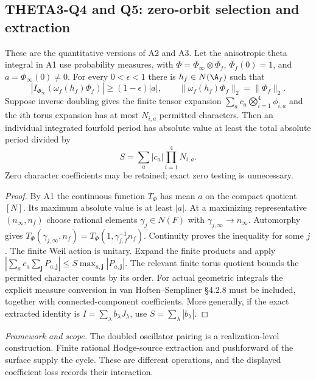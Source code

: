 \documentclass[11pt]{article}
\newcommand{\framework}[1]{\par\smallskip\noindent\textit{Framework and scope.} #1\par}
\theoremstyle{definition}\newtheorem{definition}[theorem]{Definition}\newtheorem{remark}[theorem]{Remark}
\begin{document}
\subsection{THETA3-Q4 and Q5: zero-orbit selection and extraction}\label{Q4}\label{Q5}
These are the quantitative versions of A2 and A3. Let the anisotropic theta integral in A1 use probability measures, with
$\Phi=\Phi_\infty\otimes\Phi_f$, $\Phi_f(0)=1$, and
$a=\Phi_\infty(0)\ne0$. For every $0<\epsilon<1$ there is
$h_f\in N(\A_f)$ such that
\begin{equation}\label{eq:finite-selection}
 |I_{\Phi_\infty}(\omega_f(h_f)\Phi_f)|\geq(1-\epsilon)|a|,
 \qquad\|\omega_f(h_f)\Phi_f\|_2=\|\Phi_f\|_2.
\end{equation}
Suppose inverse doubling gives the finite tensor expansion
$\sum_a c_a\bigotimes_{i=1}^4\phi_{i,a}$ and the $i$th torus expansion has at most $N_{i,a}$ permitted characters. Then an individual integrated fourfold period has absolute value at least the total absolute period divided by
\begin{equation}\label{eq:loss}
 S=\sum_a |c_a|\prod_{i=1}^4N_{i,a}.
\end{equation}
Zero character coefficients may be retained; exact zero testing is unnecessary.
\begin{proof}
By A1 the continuous function $T_\Phi$ has mean $a$ on the compact quotient $[N]$. Its maximum absolute value is at least $|a|$. At a maximizing representative $(n_\infty,n_f)$ choose rational elements $\gamma_j\in N(F)$ with $\gamma_{j,\infty}\to n_\infty$. Automorphy gives
$T_\Phi(\gamma_{j,\infty},n_f)=T_\Phi(1,\gamma_{j,f}^{-1}n_f)$.
Continuity proves the inequality for some $j$. The finite Weil action is unitary. Expand the finite products and apply
$|\sum_a c_a\sum_{\mathbf j}P_{a,\mathbf j}|
\leq S\max_{a,\mathbf j}|P_{a,\mathbf j}|$.
The relevant finite torus quotient bounds the permitted character counts by its order. For actual geometric integrals the explicit measure conversion in van Hoften--Sempliner \S4.2.8 must be included, together with connected-component coefficients. More generally, if the exact extracted identity is $I=\sum_\lambda b_\lambda J_\lambda$, use $S=\sum_\lambda|b_\lambda|$.
\end{proof}
\framework{The doubled oscillator pairing is a realization-level construction. Finite rational Hodge-source extraction and pushforward of the surface supply the cycle. These are different operations, and the displayed coefficient loss records their interaction.}
\end{document}
